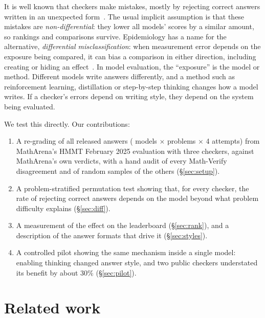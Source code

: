 \documentclass[11pt]{article}
\begin{document}
It is well known that checkers make mistakes, mostly by rejecting correct answers written in an unexpected form~\citep{huang2025verifiers,xu2025tinyv,xin2026verifier}.
The usual implicit assumption is that these mistakes are \emph{non-differential}: they lower all models' scores by a similar amount, so rankings and comparisons survive.
Epidemiology has a name for the alternative, \emph{differential misclassification}: when measurement error depends on the exposure being compared, it can bias a comparison in either direction, including creating or hiding an effect~\citep{rothman2008modern}.
In model evaluation, the ``exposure'' is the model or method. Different models write answers differently, and a method such as reinforcement learning, distillation or step-by-step thinking changes how a model writes. If a checker's errors depend on writing style, they depend on the system being evaluated.

We test this directly. Our contributions:
\begin{enumerate}
  \item A re-grading of all \maAnswers{} released answers (\maModels{} models $\times$ \maProblems{} problems $\times$ 4 attempts) from MathArena's HMMT February 2025 evaluation with three checkers, against MathArena's own verdicts, with a hand audit of every Math-Verify disagreement and of random samples of the others (\S\ref{sec:setup}).
  \item A problem-stratified permutation test showing that, for every checker, the rate of rejecting correct answers depends on the model beyond what problem difficulty explains (\S\ref{sec:diff}).
  \item A measurement of the effect on the leaderboard (\S\ref{sec:rank}), and a description of the answer formats that drive it (\S\ref{sec:styles}).
  \item A controlled pilot showing the same mechanism inside a single model: enabling thinking changed answer style, and two public checkers understated its benefit by about 30\% (\S\ref{sec:pilot}).
\end{enumerate}

\section{Related work}
\end{document}
